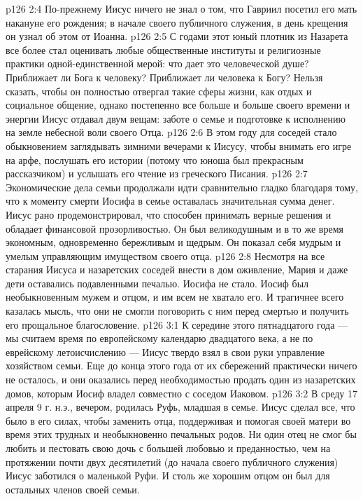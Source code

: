 \vs p126 2:4 По\hyp{}прежнему Иисус ничего не знал о том, что Гавриил посетил его мать накануне его рождения; в начале своего публичного служения, в день крещения он узнал об этом от Иоанна.
\vs p126 2:5 \pc С годами этот юный плотник из Назарета все более стал оценивать любые общественные институты и религиозные практики одной\hyp{}единственной мерой: что дает это человеческой душе? Приближает ли Бога к человеку? Приближает ли человека к Богу? Нельзя сказать, чтобы он полностью отвергал такие сферы жизни, как отдых и социальное общение, однако постепенно все больше и больше своего времени и энергии Иисус отдавал двум вещам: заботе о семье и подготовке к исполнению на земле небесной воли своего Отца.
\vs p126 2:6 \pc В этом году для соседей стало обыкновением заглядывать зимними вечерами к Иисусу, чтобы внимать его игре на арфе, послушать его истории (потому что юноша был прекрасным рассказчиком) и услышать его чтение из греческого Писания.
\vs p126 2:7 Экономические дела семьи продолжали идти сравнительно гладко благодаря тому, что к моменту смерти Иосифа в семье оставалась значительная сумма денег. Иисус рано продемонстрировал, что способен принимать верные решения и обладает финансовой прозорливостью. Он был великодушным и в то же время экономным, одновременно бережливым и щедрым. Он показал себя мудрым и умелым управляющим имуществом своего отца.
\vs p126 2:8 Несмотря на все старания Иисуса и назаретских соседей внести в дом оживление, Мария и даже дети оставались подавленными печалью. Иосифа не стало. Иосиф был необыкновенным мужем и отцом, и им всем не хватало его. И трагичнее всего казалась мысль, что они не смогли поговорить с ним перед смертью и получить его прощальное благословение.
\vs p126 3:1 К середине этого пятнадцатого года --- мы считаем время по европейскому календарю двадцатого века, а не по еврейскому летоисчислению --- Иисус твердо взял в свои руки управление хозяйством семьи. Еще до конца этого года от их сбережений практически ничего не осталось, и они оказались перед необходимостью продать один из назаретских домов, которым Иосиф владел совместно с соседом Иаковом.
\vs p126 3:2 В среду 17 апреля 9 г. н.э., вечером, родилась Руфь, младшая в семье. Иисус сделал все, что было в его силах, чтобы заменить отца, поддерживая и помогая своей матери во время этих трудных и необыкновенно печальных родов. Ни один отец не смог бы любить и пестовать свою дочь с большей любовью и преданностью, чем на протяжении почти двух десятилетий (до начала своего публичного служения) Иисус заботился о маленькой Руфи. И столь же хорошим отцом он был для остальных членов своей семьи.
